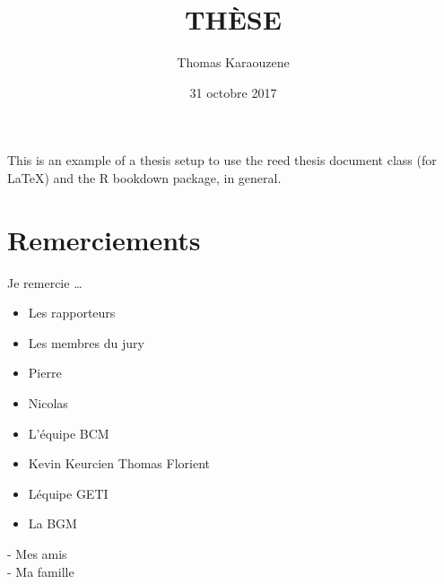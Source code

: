 \documentclass[12pt,twoside]{reedthesis}
\title{THÈSE}
\author{Thomas Karaouzene}
\date{31 octobre 2017}
\providecommand{\tightlist}{%
  \setlength{\itemsep}{0pt}\setlength{\parskip}{0pt}}
\theoremstyle{definition}
\theoremstyle{definition}
\theoremstyle{remark}
\begin{document}
      \maketitle
  
  \frontmatter %
  \pagestyle{empty} %

  
      \begin{preface}
      This is an example of a thesis setup to use the reed thesis document
      class (for LaTeX) and the R bookdown package, in general.
    \end{preface}
  
      \hypersetup{linkcolor=black}
    \setcounter{tocdepth}{3}
    \tableofcontents
  
      \listoftables
  
      \listoffigures
  
  
  
  \mainmatter %
  \pagestyle{fancyplain} %

  \chapter*{Remerciements}\label{remerciements}
  
  Je remercie \ldots{}
  
  \begin{itemize}
  \tightlist
  \item
    Les rapporteurs
  \item
    Les membres du jury\\
  \item
    Pierre\\
  \item
    Nicolas\\
  \item
    L'équipe BCM\\
  \item
    Kevin Keurcien Thomas Florient\\
  \item
    Léquipe GETI\\
  \item
    La BGM
  \end{itemize}
  
   - Mes amis\\
  - Ma famille
  
\end{document}
